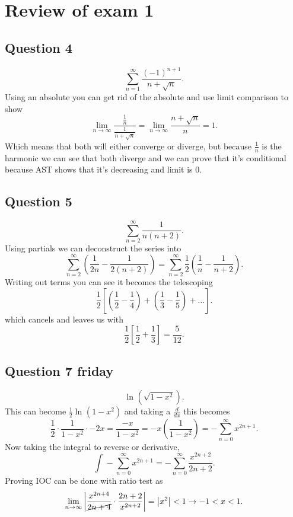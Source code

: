 \section{Review of exam 1}%
\label{sec:Review of exam 1}
\subsection{Question 4}%
\label{sub:Question 4}
\[
\sum_{ n=1 } ^{ \infty } \frac{ \left( -1 \right) ^{ n+1 } }{ n+\sqrt{ n} }
.\] 
Using an absolute you can get rid of the absolute and use limit comparison to show 
\[
\lim_{ n \to \infty} \frac{ \frac{ 1 }{ n }  }{ \frac{ 1 }{ n+\sqrt{ n} }  }=\lim_{ n \to \infty} \frac{ n+\sqrt{ n} }{ n }=1
.\] 
Which means that both will either converge or diverge, but because $ \frac{ 1 }{ n }  $ is the harmonic we can see that both diverge and we can prove that it's conditional because AST shows that it's decreasing and limit is 0.
\subsection{Question 5}%
\label{sub:Question 5}
\[
\sum_{ n=2 } ^{ \infty } \frac{ 1 }{ n\left( n+2 \right)  } 
.\] 
Using partials we can deconstruct the series into 
\[
\sum_{ n=2 } ^{ \infty } \left( \frac{ 1 }{ 2n  } - \frac{ 1 }{ 2\left( n+2 \right)  }  \right) = \sum_{ n=2 } ^{ \infty } \frac{ 1 }{ 2 } \left( \frac{ 1 }{ n } -\frac{ 1 }{ n+2 }  \right) 
.\] 
Writing out terms you can see it becomes the telescoping
\[
\frac{ 1 }{ 2 } \left[ \left( \frac{ 1 }{ 2 } -\frac{ 1 }{ 4 }  \right) + \left( \frac{ 1 }{ 3 } -\frac{ 1 }{ 5 }  \right) + \ldots \right] 
.\] 
which cancels and leaves us with
\[
\frac{ 1 }{ 2 } \left[ \frac{ 1 }{ 2 } +\frac{ 1 }{ 3 }  \right] = \frac{ 5 }{ 12 } 
.\] 
\subsection{Question 7 friday}%
\label{sub:Question 7 friday}
\[
\ln^{  } \left( \sqrt{ 1-x^2} \right) 
.\] 
This can become $ \frac{ 1 }{ 2 } \ln^{  } \left( 1-x^2 \right)  $ and taking a $ \frac{ d }{ dx }  $ this becomes
\[
\frac{ 1 }{ 2 } \cdot \frac{ 1 }{ 1-x^2 } \cdot -2x= \frac{ -x }{ 1-x^2 } = -x\left( \frac{ 1 }{ 1-x^2 }  \right) =-\sum_{ n=0 } ^{ \infty } x^{ 2n+1 }
.\] 
Now taking the integral to reverse or derivative,
\[
\int_{  }^{  } -\sum_{ n=0 } ^{ \infty } x^{ 2n+1 }=-\sum_{ n=0 } ^{ \infty } \frac{ x^{ 2n+2 } }{ 2n+2 }
.\] 
Proving IOC can be done with ratio test as
\[
	\lim_{ n \to \infty} \left| \frac{ x^{ 2n+4 } }{ \cancel{ 2n+4 }} \cdot \frac{ 2n+2 }{ x^{ 2n+2 } } \right| = \left| x^2 \right| <1 \to -1<x<1 
.\] 

